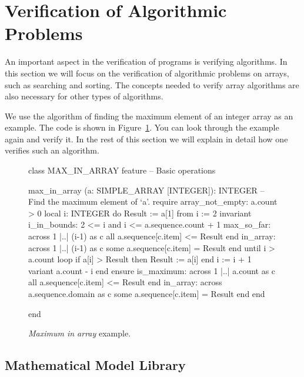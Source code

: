 \documentclass[a4paper,12pt]{article}
\begin{document}
\newpage
\section{Verification of Algorithmic Problems}

An important aspect in the verification of programs is verifying algorithms. In this section we will focus on the verification of algorithmic problems on arrays, such as searching and sorting. The concepts needed to verify array algorithms are also necessary for other types of algorithms.

We use the algorithm of finding the maximum element of an integer array as an example. The code is shown in Figure~\ref{code:max_in_array}. You can look through the example again and verify it. In the rest of this section we will explain in detail how one verifies such an algorithm.

\begin{figure}[!h]
\begin{adjustwidth}{-10pt}{-10pt}
\begin{erunning}[basicstyle=\footnotesize,numbers=left]
class MAX_IN_ARRAY
feature -- Basic operations

	max_in_array (a: SIMPLE_ARRAY [INTEGER]): INTEGER
			-- Find the maximum element of `a'.
		require
			array_not_empty: a.count > 0
		local 
			i: INTEGER
		do
			Result := a[1]
			from
				i := 2
			invariant
				i_in_bounds: 2 <= i and i <= a.sequence.count + 1
				max_so_far: across 1 |..| (i-1) as c all a.sequence[c.item] <= Result end
				in_array: across 1 |..| (i-1) as c some a.sequence[c.item] = Result end
			until
				i > a.count
			loop
				if a[i] > Result then
					Result := a[i]
				end
				i := i + 1
			variant
				a.count - i
			end
		ensure
			is_maximum: across 1 |..| a.count as c all a.sequence[c.item] <= Result end
			in_array: across a.sequence.domain as c some a.sequence[c.item] = Result end
		end

end
\end{erunning}
\end{adjustwidth}
\caption{\emph{Maximum in array} example.}
\label{code:max_in_array}
\end{figure}

\subsection{Mathematical Model Library} \label{sec:mml}
\end{document}

